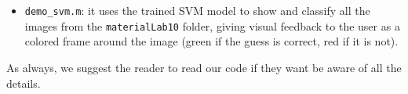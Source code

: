 \begin{itemize}
\item \texttt{demo\_svm.m}: it uses the trained SVM model to show and classify all the images from the \texttt{materialLab10} folder, giving visual feedback to the user as a colored frame around the image (green if the guess is correct, red if it is not).
\end{itemize}

As always, we suggest the reader to read our code if they want be aware of all the details.